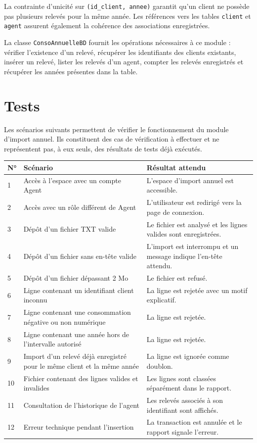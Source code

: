 La contrainte d'unicité sur \texttt{(id\_client, annee)} garantit qu'un client ne possède pas plusieurs relevés pour la même année. Les références vers les tables \texttt{client} et \texttt{agent} assurent également la cohérence des associations enregistrées.

La classe \texttt{ConsoAnnuelleBD} fournit les opérations nécessaires à ce module : vérifier l'existence d'un relevé, récupérer les identifiants des clients existants, insérer un relevé, lister les relevés d'un agent, compter les relevés enregistrés et récupérer les années présentes dans la table.

\section{Tests}

Les scénarios suivants permettent de vérifier le fonctionnement du module d'import annuel. Ils constituent des cas de vérification à effectuer et ne représentent pas, à eux seuls, des résultats de tests déjà exécutés.

\begin{longtable}{|p{0.8cm}|p{5.2cm}|p{7cm}|}
\hline
\textbf{N°} & \textbf{Scénario} & \textbf{Résultat attendu} \\
\hline
1 & Accès à l'espace avec un compte Agent & L'espace d'import annuel est accessible. \\
\hline
2 & Accès avec un rôle différent de Agent & L'utilisateur est redirigé vers la page de connexion. \\
\hline
3 & Dépôt d'un fichier TXT valide & Le fichier est analysé et les lignes valides sont enregistrées. \\
\hline
4 & Dépôt d'un fichier sans en-tête valide & L'import est interrompu et un message indique l'en-tête attendu. \\
\hline
5 & Dépôt d'un fichier dépassant 2 Mo & Le fichier est refusé. \\
\hline
6 & Ligne contenant un identifiant client inconnu & La ligne est rejetée avec un motif explicatif. \\
\hline
7 & Ligne contenant une consommation négative ou non numérique & La ligne est rejetée. \\
\hline
8 & Ligne contenant une année hors de l'intervalle autorisé & La ligne est rejetée. \\
\hline
9 & Import d'un relevé déjà enregistré pour le même client et la même année & La ligne est ignorée comme doublon. \\
\hline
10 & Fichier contenant des lignes valides et invalides & Les lignes sont classées séparément dans le rapport. \\
\hline
11 & Consultation de l'historique de l'agent & Les relevés associés à son identifiant sont affichés. \\
\hline
12 & Erreur technique pendant l'insertion & La transaction est annulée et le rapport signale l'erreur. \\
\hline
\end{longtable}

